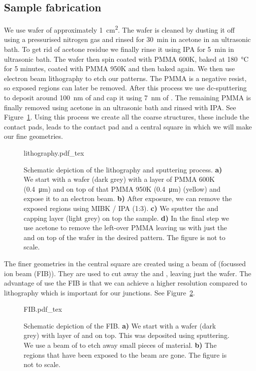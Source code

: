 \subsection{Sample fabrication}
\label{sec:method-sample-fabrication}
We use  wafer of approximately \qty{1}{\square\centi\meter}. The wafer is cleaned by dusting it off using a pressurised nitrogen gas and rinsed for \qty{30}{\minute} in acetone in an ultrasonic bath. To get rid of acetone residue we finally rinse it using IPA for \qty{5}{\minute} in ultrasonic bath. The wafer then spin coated with PMMA 600K, baked at \qty{180}{\celsius} for 5 minutes, coated with PMMA 950K and then baked again. We then use electron beam lithography to etch our patterns. The PMMA is a negative resist, so exposed regions can later be removed. After this process we use dc-sputtering to deposit around \qty{100}{\nano\meter} of  and cap it using \qty{7}{\nano\meter} of . The remaining PMMA is finally removed using acetone in an ultrasonic bath and rinsed with IPA. See Figure~\ref{fig:lithography}. Using this process we create all the coarse structures, these include the contact pads, leads to the contact pad and a central square in which we will make our fine geometries.

\begin{figure}[ht!]
	\centering
	\def\svgwidth{\textwidth}
	{lithography.pdf_tex}
	\caption{Schematic depiction of the lithography and sputtering process. \textbf{a)} We start with a  wafer (dark grey) with a layer of PMMA 600K (\qty{0.4}{\micro\meter}) and on top of that PMMA 950K (\qty{0.4}{\micro\meter}) (yellow) and expose it to an electron beam. \textbf{b)} After exposure, we can remove the exposed regions using MIBK / IPA (1:3). \textbf{c)} We sputter the  and  capping layer (light grey) on top the sample. \textbf{d)} In the final step we use acetone to remove the left-over PMMA leaving us with just the  and  on top of the wafer in the desired pattern. The figure is not to scale.}
	\label{fig:lithography}
\end{figure}

The finer geometries in the central square are created using a beam of  (focussed ion beam (FIB)). They are used to cut away the  and , leaving just the wafer. The advantage of use the FIB is that we can achieve a higher resolution compared to lithography which is important for our junctions. See Figure~\ref{fig:FIB}.

\begin{figure}[ht!]
	\centering
	\def\svgwidth{0.5\textwidth}
	{FIB.pdf_tex}
	\caption{Schematic depiction of the FIB. \textbf{a)} We start with a  wafer (dark grey) with layer of  and  on top. This was deposited using sputtering. We use a beam of  to etch away small pieces of material. \textbf{b)} The regions that have been exposed to the  beam are gone. The figure is not to scale.}
	\label{fig:FIB}
\end{figure}

